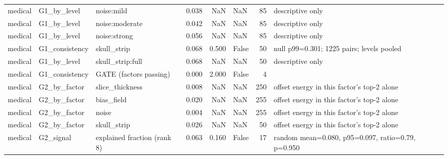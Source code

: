 \begin{tabular}{lllrrlrl}
medical & G1\_by\_level & noise:mild & 0.038 & NaN & NaN & 85 & descriptive only \\
medical & G1\_by\_level & noise:moderate & 0.042 & NaN & NaN & 85 & descriptive only \\
medical & G1\_by\_level & noise:strong & 0.056 & NaN & NaN & 85 & descriptive only \\
medical & G1\_consistency & skull\_strip & 0.068 & 0.500 & False & 50 & null p99=0.301; 1225 pairs; levels pooled \\
medical & G1\_by\_level & skull\_strip:full & 0.068 & NaN & NaN & 50 & descriptive only \\
medical & G1\_consistency & GATE (factors passing) & 0.000 & 2.000 & False & 4 &  \\
medical & G2\_by\_factor & slice\_thickness & 0.008 & NaN & NaN & 250 & offset energy in this factor's top-2 alone \\
medical & G2\_by\_factor & bias\_field & 0.020 & NaN & NaN & 255 & offset energy in this factor's top-2 alone \\
medical & G2\_by\_factor & noise & 0.004 & NaN & NaN & 255 & offset energy in this factor's top-2 alone \\
medical & G2\_by\_factor & skull\_strip & 0.026 & NaN & NaN & 50 & offset energy in this factor's top-2 alone \\
medical & G2\_signal & explained fraction (rank 8) & 0.063 & 0.160 & False & 17 & random mean=0.080, p95=0.097, ratio=0.79, p=0.950 \\
\bottomrule
\end{tabular}
